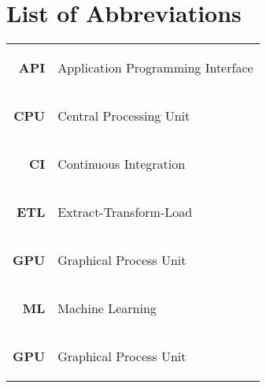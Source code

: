 \chapter*{List of Abbreviations}
%
\begin{tabular}{rl}
\hypertarget{abbr:api}{\textbf{API}} & Application Programming Interface
\\
\hypertarget{abbr:cpu}{\textbf{CPU}} & Central Processing Unit
\\
\hypertarget{abbr:ci}{\textbf{CI}} & Continuous Integration
\\
\hypertarget{abbr:etl}{\textbf{ETL}} & Extract-Transform-Load
\\
\hypertarget{abbr:gpu}{\textbf{GPU}} & Graphical Process Unit
\\
\hypertarget{abbr:ml}{\textbf{ML}} & Machine Learning
\\
\hypertarget{abbr:gpu}{\textbf{GPU}} & Graphical Process Unit
\end{tabular}